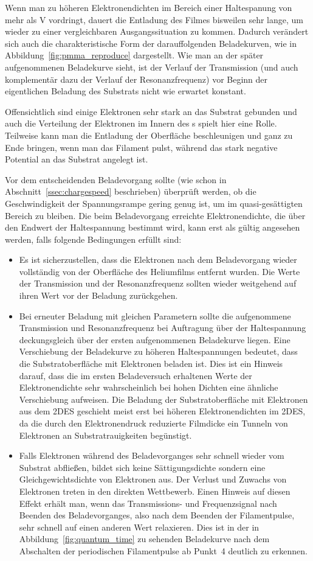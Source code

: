 Wenn man zu höheren Elektronendichten im Bereich einer Haltespanung von mehr als \unit[1]{V} vordringt, dauert die Entladung des Filmes bisweilen sehr lange, um wieder zu einer vergleichbaren Ausgangssituation zu kommen. Dadurch verändert sich auch die charakteristische Form der darauffolgenden Beladekurven, wie in Abbildung~\ref{fig:pmma_reproduce} dargestellt. Wie man an der später aufgenommenen Beladekurve sieht, ist der Verlauf der Transmission (und auch komplementär dazu der Verlauf der Resonanzfrequenz) vor Beginn der eigentlichen Beladung des Substrats nicht wie erwartet konstant.

Offensichtlich sind einige Elektronen sehr stark an das Substrat gebunden und auch die Verteilung der Elektronen im Innern des \HR{}s spielt hier eine Rolle. Teilweise kann man die Entladung der Oberfläche beschleunigen und ganz zu Ende bringen, wenn man das Filament pulst, während das stark negative Potential an das Substrat angelegt ist.

Vor dem entscheidenden Beladevorgang sollte (wie schon in Abschnitt~\ref{ssec:chargespeed} beschrieben) überprüft werden, ob die Geschwindigkeit der Spannungsrampe gering genug ist, um im quasi-gesättigten Bereich zu bleiben. Die beim Beladevorgang erreichte Elektronendichte, die über den Endwert der Haltespannung bestimmt wird, kann erst als gültig angesehen werden, falls folgende Bedingungen erfüllt sind:
\begin{itemize}
    \item Es ist sicherzustellen, dass die Elektronen nach dem Beladevorgang wieder vollständig von der Oberfläche des Heliumfilms entfernt wurden. Die Werte der Transmission und der Resonanzfrequenz sollten wieder weitgehend auf ihren Wert vor der Beladung zurückgehen.
    \item Bei erneuter Beladung mit gleichen Parametern sollte die aufgenommene Transmission und Resonanzfrequenz bei Auftragung über der Haltespannung deckungsgleich über der ersten aufgenommenen Beladekurve liegen. Eine Verschiebung der Beladekurve zu höheren Haltespannungen bedeutet, dass die Substratoberfläche mit Elektronen beladen ist. Dies ist ein Hinweis darauf, dass die im ersten Beladeversuch erhaltenen Werte der Elektronendichte sehr wahrscheinlich bei hohen Dichten eine ähnliche Verschiebung aufweisen. Die Beladung der Substratoberfläche mit Elektronen aus dem 2DES geschieht meist erst bei höheren Elektronendichten im 2DES, da die durch den Elektronendruck reduzierte Filmdicke ein Tunneln von Elektronen an Substratrauigkeiten begünstigt.
    \item Falls Elektronen während des Beladevorganges sehr schnell wieder vom Substrat abfließen, bildet sich keine Sättigungsdichte sondern eine Gleichgewichtsdichte von Elektronen aus. Der Verlust und Zuwachs von Elektronen treten in den direkten Wettbewerb. Einen Hinweis auf diesen Effekt erhält man, wenn das Transmissions- und Frequenzsignal nach Beenden des Beladevorganges, also nach dem Beenden der Filamentpulse, sehr schnell auf einen anderen Wert relaxieren. Dies ist in der in Abbildung~\ref{fig:quantum_time} zu sehenden Beladekurve nach dem Abschalten der periodischen Filamentpulse ab Punkt~4 deutlich zu erkennen.
\end{itemize}

